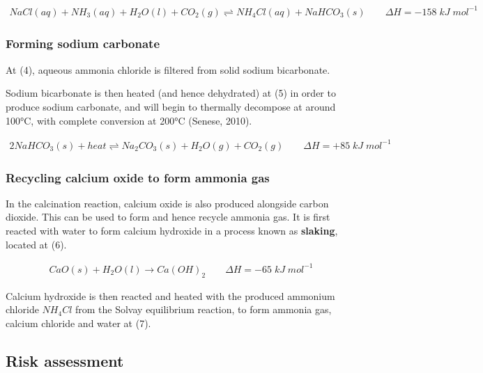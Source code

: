 \documentclass[12pt, a4paper]{article}
\begin{document}
\begin{align}
	NaCl(aq) + NH_{3}(aq) + H_{2}O(l) + CO_{2}(g) \rightleftharpoons NH_{4}Cl(aq) + NaHCO_{3}(s)  \qquad \Delta H = -158 \; kJ \; mol^{-1}
\end{align}

\subsubsection{Forming sodium carbonate}

At (4), aqueous ammonia chloride is filtered from solid sodium bicarbonate. 

Sodium bicarbonate is then heated (and hence dehydrated) at (5) in order to produce sodium carbonate, and will begin to thermally decompose at around 100°C, with complete conversion at 200°C (Senese, 2010).

\begin{align}
	2NaHCO_{3}(s) + heat \rightleftharpoons Na_{2}CO_{3}(s) + H_{2}O(g) + CO_{2}(g) \qquad \Delta H = +85 \; kJ \; mol^{-1}
\end{align}


\subsubsection{Recycling calcium oxide to form ammonia gas}

In the calcination reaction, calcium oxide is also produced alongside carbon dioxide. This can be used to form and hence recycle ammonia gas. It is first reacted with water to form calcium hydroxide in a process known as \textbf{slaking}, located at (6).

\begin{align}
	CaO(s) + H_{2}O(l) \rightarrow Ca(OH)_{2} \qquad \Delta H = -65 \; kJ \; mol^{-1}
\end{align}

Calcium hydroxide is then reacted and heated with the produced ammonium chloride \(NH_{4}Cl\) from the Solvay equilibrium reaction, to form ammonia gas, calcium chloride and water at (7).


\subsection{Risk assessment}
\end{document}
